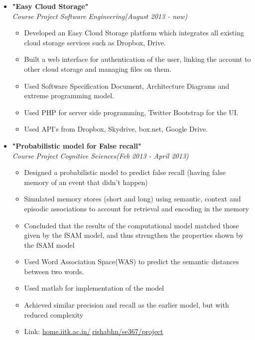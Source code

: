 \documentclass[margin,line]{resume}
\begin{document}
\begin{resume}
\begin{itemize}
  \item \large{\textbf{\textsf{"Easy Cloud Storage"}}}
    \\ \small{\textit{Course Project Software Engineering(August 2013 - now)}}
    \normalsize
    \begin{itemize}
    \item Developed an Easy Cloud Storage platform which integrates all existing cloud storage services such as Dropbox, Drive.
    \item Built a web interface for authentication of the user, linking the account to other cloud storage and managing files on them.
    \item Used Software Specification Document, Architecture Diagrams and extreme programming model.
    \item Used PHP for server side programming, Twitter Bootstrap for the UI.
    \item Used API's from Dropbox, Skydrive, box.net, Google Drive.
    \end{itemize}
  \item \large{\textbf{\textsf{"Probabilistic model for False recall"}}}
    \\ \small{\textit{Course Project Cognitive Sciences(Feb 2013 - April 2013)}}
    \normalsize
    \begin{itemize}
    \item Designed a probabilistic model to predict false recall (having false memory of an event that didn't happen)
    \item Simulated memory stores (short and long) using semantic, context and episodic associations to account for retrieval and encoding in the memory
    \item Concluded that the results of the computational model matched those given by the fSAM model, and thus strengthen the properties shown by the fSAM model
    \item Used Word Association Space(WAS) to predict the semantic distances between two words.
    \item Used matlab for implementation of the model
    \item Achieved similar precision and recall as the earlier model, but with reduced complexity
    \item Link: \href{http://home.iitk.ac.in/~rishabhn/se367/project/}{home.iitk.ac.in/$~$rishabhn/se367/project}
    \end{itemize}



\end{itemize}
\end{resume}
\end{document}
